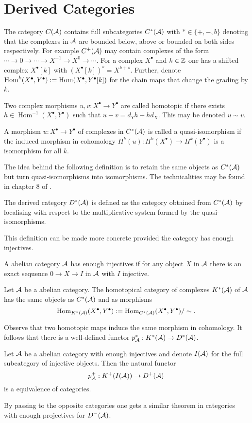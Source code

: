 \section{Derived Categories}
The category $C(\AA)$ contains full subcategories $C^*(\AA)$ with $*\in \{ +, -, b\}$ denoting that the complexes in $\AA$ are bounded below, above or bounded on both sides respectively.
For example $C^+(\AA)$ may contain complexes of the form $\cdots \to 0\to \cdots \to X^{-1} \to X^0 \to \cdots$.
For a complex $X^\bullet$ and $k\in \Z$ one has a shifted complex $X^\bullet[k]$ with $(X^\bullet[k])^s = X^{k+s}$.
Further, denote $\operatorname{Hom}^k(X^\bullet, Y^\bullet) :=  \op{Hom}(X^\bullet, Y^\bullet[k])$ for the chain maps that change the grading by $k$.
\begin{definition}
 Two complex morphisms $u,v:X^\bullet\to Y^\bullet$ are called homotopic if there exists $h\in \operatorname{Hom}^{-1}(X^\bullet, Y^\bullet)$ such that $u-v = d_Y h + hd_X$. This may be denoted $u\sim v$.
\end{definition}
\begin{definition}
 A morphism $u:X^\bullet\to Y^\bullet$  of complexes in $C^*(\AA)$ is called a quasi-isomorphism if the induced morphism in cohomology $H^k(u):H^k(X^\bullet) \to H^k(Y^\bullet)$ is a isomorphism for all $k$.
\end{definition}
The idea behind the following definition is to retain the same objects as $C^*(\AA)$ but turn quasi-isomorphisms into isomorphisms.
The technicalities may be found in chapter 8 of \cite{deligne1977sga}.
\begin{definition}
  The derived category $D^*(\AA)$ is defined as the category obtained from $C^*(\AA)$ by localising with respect to the multiplicative system formed by the quasi-isomorphisms.
\end{definition}
This definition can be made more concrete provided the category has enough injectives.
\begin{definition}
 A abelian category $\AA$ has enough injectives if for any object $X$ in $\AA$ there is an exact sequence $0\to X \to I$ in $\AA$ with $I$ injective.
\end{definition}
\begin{definition}
 Let $\AA$ be a abelian category.
 The homotopical category of complexes $K^*(\AA)$ of $\AA$ has the same objects as $C^*(\AA)$ and as morphisms
 $$\operatorname{Hom}_{K^*(\AA)}(X^\bullet,Y^\bullet):= \operatorname{Hom}_{C^*(\AA)}(X^\bullet,Y^\bullet)/\sim.$$
\end{definition}
Observe that two homotopic maps induce the same morphism in cohomology.
It follows that there is a well-defined functor $p_\AA^*:K^*(\AA)\to D^*(\AA)$.
\begin{proposition}{\cite[Proposition 1.3.10.]{dimca2004sheaves}}\label{prop: DerivedCategoryInjectives}
 Let $\AA$ be a abelian category with enough injectives and denote $I(\AA)$ for the full subcategory of injective objects.
 Then the natural functor
 $$p_\AA^+: K^+(I(\AA))\to D^+(\AA) $$
 is a equivalence of categories.
\end{proposition}
By passing to the opposite categories one gets a similar theorem in categories with enough projectives for $D^-(\AA)$.
